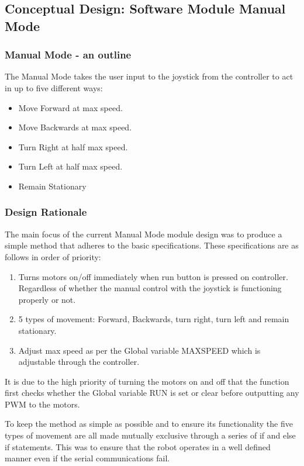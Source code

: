 \documentclass[MTRX3700report.tex]{subfiles}
\begin{document}
	\subsection{Conceptual Design: Software Module Manual Mode}
	
	\subsubsection{Manual Mode - an outline}
	The Manual Mode takes the user input to the joystick from the controller to act in up to five different ways:
	
	\begin{itemize}
		\item Move Forward at max speed.
		\item Move Backwards at max speed.
		\item Turn Right at half max speed.
		\item Turn Left at half max speed.
		\item Remain Stationary
	\end{itemize} 
	
	
	\subsubsection{Design Rationale}
	The main focus of the current Manual Mode module design was to produce a simple method that adheres to the basic specifications. These specifications are as follows in order of priority:
	
	\begin{enumerate}
		\item Turns motors on/off immediately when run button is pressed on controller. Regardless of whether the manual control with the joystick is functioning properly or not.
		\item 5 types of movement: Forward, Backwards, turn right, turn left and remain stationary.
		\item Adjust max speed as per the Global variable MAX\textunderscore SPEED which is adjustable through the controller.  	
	\end{enumerate} 
	
	It is due to the high priority of turning the motors on and off that the function first checks whether the Global variable RUN is set or clear before outputting any PWM to the motors.
	
	To keep the method as simple as possible and to ensure its functionality the five types of movement are all made mutually exclusive through a series of if and else if statements. This was to ensure that the robot operates in a well defined manner even if the serial communications fail. 
	
\end{document}
